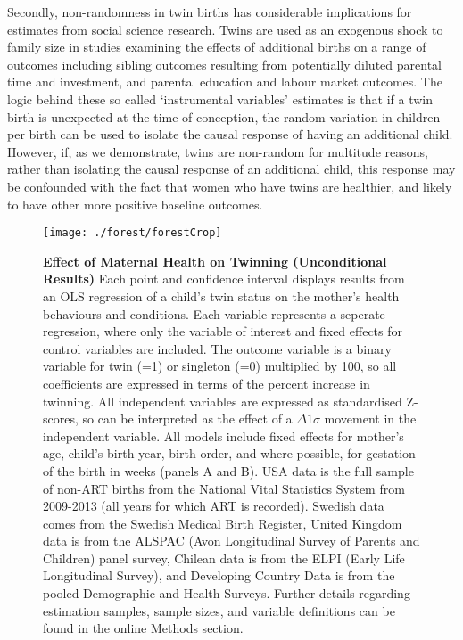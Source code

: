 \documentclass{nature}
\begin{document}
\begin{linenumbers}
Secondly, non-randomness in twin births has considerable implications for estimates from social science research.  Twins are used as an exogenous shock to family size in studies examining the effects of additional births on a range of outcomes including sibling outcomes resulting from potentially diluted parental time and investment, and parental education and labour market outcomes.  The logic behind these so called `instrumental variables' estimates is that if a twin birth is unexpected at the time of conception, the random variation in children per birth can be used to isolate the causal response of having an additional child.  However, if, as we demonstrate, twins are non-random for multitude reasons, rather than isolating the causal response of an additional child, this response may be confounded with the fact that women who have twins are healthier, and likely to have other more positive baseline outcomes.


\clearpage
%

\thispagestyle{empty}
\begin{spacing}{1}
\begin{figure}
\begin{center}
  \texttt{[image: ./forest/forestCrop]}
\end{center}
\caption{\textbf{Effect of Maternal Health on Twinning (Unconditional Results)} {\footnotesize Each point and confidence interval displays results from an OLS regression of a child's twin status on the mother's health behaviours and conditions. Each variable represents a seperate regression, where only the variable of interest and fixed effects for control variables are included. The outcome variable is a binary variable for twin (=1) or singleton (=0) multiplied by 100, so all coefficients are expressed in terms of the percent increase in twinning.  All independent variables are expressed as standardised Z-scores, so can be interpreted as the effect of a $\Delta 1\sigma$ movement in the independent variable. All models include fixed effects for mother's age, child's birth year, birth order, and where possible, for gestation of the birth in weeks (panels A and B).  USA data is the full sample of non-ART births from the National Vital Statistics System from 2009-2013 (all years for which ART is recorded).  Swedish data comes from the Swedish Medical Birth Register, United Kingdom data is from the ALSPAC (Avon Longitudinal Survey of Parents and Children) panel survey, Chilean data is from the ELPI (Early Life Longitudinal Survey), and Developing Country Data is from the pooled Demographic and Health Surveys. Further details regarding estimation samples, sample sizes, and variable definitions can be found in the online Methods section.}}
\label{fig:fullEsts}
\end{figure}



\end{spacing}
\end{linenumbers}
\end{document}
